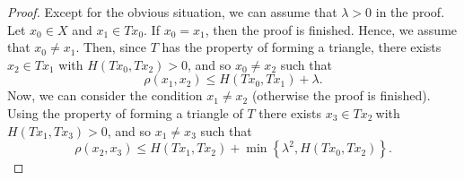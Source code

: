 \documentclass[10pt,a4paper]{amsart}
\begin{document}
\begin{proof}
Except for the obvious situation, we can assume that $\lambda >0$ in the
proof. Let $x_{0}\in X$ and $x_{1}\in Tx_{0}$. If $x_{0}=x_{1}$, then the
proof is finished. Hence, we assume that $x_{0}\neq x_{1}$. Then, since $T$
has the property of forming a triangle, there exists $x_{2}\in Tx_{1}$ with $%
H(Tx_{0},Tx_{2})>0$, and so $x_{0}\neq x_{2}$ such that 
\begin{equation}
\rho (x_{1},x_{2})\leq H(Tx_{0},Tx_{1})+\lambda .  \label{E1}
\end{equation}%
Now, we can consider the condition $x_{1}\neq x_{2}$ (otherwise the proof is
finished). Using the property of forming a triangle of $T$ there exists $%
x_{3}\in Tx_{2}~$with $H(Tx_{1},Tx_{3})>0$, and so $x_{1}\neq x_{3}$ such
that 
\begin{equation}
\rho (x_{2},x_{3})\leq H(Tx_{1},Tx_{2})+\min \left \{ \lambda
^{2},H(Tx_{0},Tx_{2})\right \} .  \label{E2}
\end{equation}


\end{proof}
\end{document}
